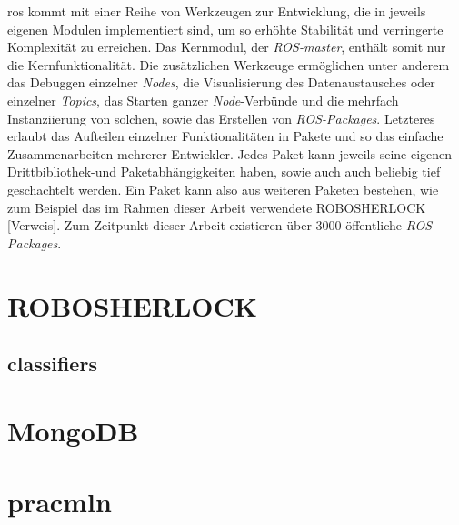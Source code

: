 \gls{ros} kommt mit einer Reihe von Werkzeugen zur Entwicklung, die in jeweils eigenen Modulen implementiert sind, um so erhöhte Stabilität und verringerte Komplexität zu erreichen. Das Kernmodul, der \textit{ROS-master}, enthält somit nur die Kernfunktionalität. Die zusätzlichen Werkzeuge ermöglichen unter anderem das Debuggen einzelner \textit{Nodes}, die Visualisierung des Datenaustausches oder einzelner \textit{Topics}, das Starten ganzer \textit{Node}-Verbünde und die mehrfach Instanziierung von solchen, sowie das Erstellen von \textit{ROS-Packages}. Letzteres erlaubt das Aufteilen einzelner Funktionalitäten in Pakete und so das einfache Zusammenarbeiten mehrerer Entwickler. Jedes Paket kann jeweils seine eigenen Drittbibliothek-und Paketabhängigkeiten haben, sowie auch auch beliebig tief geschachtelt werden. Ein Paket kann also aus weiteren Paketen bestehen, wie zum Beispiel das im Rahmen dieser Arbeit verwendete ROBOSHERLOCK [Verweis]. Zum Zeitpunkt dieser Arbeit existieren über 3000 öffentliche \textit{ROS-Packages}.   

\section{ROBOSHERLOCK}
\label{chap:robosherlock}

\subsection{classifiers}
\label{chap:classifiers}


\section{MongoDB}
\label{chap:mongodb}


\section{pracmln}
\label{chap:pracmln}
